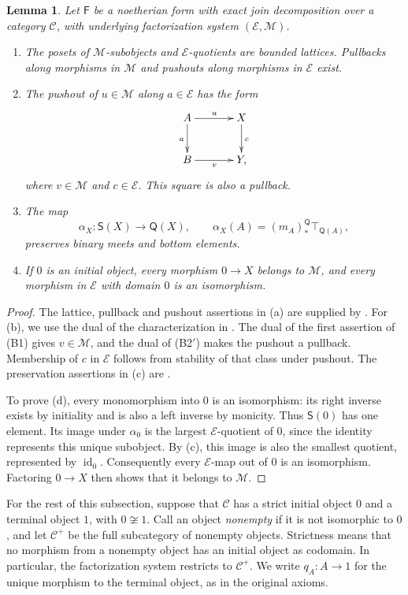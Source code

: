 \documentclass[11pt,a4paper]{article}
\theoremstyle{plain}
\newtheorem{lemma}[theorem]{Lemma}
\theoremstyle{definition}
\theoremstyle{remark}
\newcommand{\id}{\operatorname{id}}
\begin{document}
\begin{lemma}\label{lem:ejd-background}
Let $\mathsf F$ be a noetherian form with exact join decomposition
over a category $\mathcal C$, with underlying factorization system
$(\mathcal E,\mathcal M)$.
\begin{enumerate}
\item The posets of $\mathcal M$-subobjects and
$\mathcal E$-quotients are bounded lattices. Pullbacks along
morphisms in $\mathcal M$ and pushouts along morphisms in
$\mathcal E$ exist.
\item The pushout of $u\in\mathcal M$ along $a\in\mathcal E$
has the form
\[
\xymatrix@C=3.5em@R=2.4em{
A\ar[r]^u\ar[d]_a&X\ar[d]^c\\
B\ar[r]_v&Y,
}
\]
where $v\in\mathcal M$ and $c\in\mathcal E$. This square is
also a pullback.
\item The map
\[
\alpha_X:\mathsf S(X)\longrightarrow\mathsf Q(X),\qquad
\alpha_X(A)=(m_A)_*^{\mathsf Q}\top_{\mathsf Q(A)},
\]
preserves binary meets and bottom elements.
\item If $0$ is an initial object, every morphism $0\to X$
belongs to $\mathcal M$, and every morphism in $\mathcal E$
with domain $0$ is an isomorphism.
\end{enumerate}
\end{lemma}
\begin{proof}
The lattice, pullback and pushout assertions in (a) are supplied
by \cite[Theorem 100]{JanelidzeVanNiekerk}. For (b), we use
the dual of the characterization in
\cite[Theorem 167]{JanelidzeVanNiekerk}. The dual of the first
assertion of (B1) gives $v\in\mathcal M$, and the dual of
(B2$'$) makes the pushout a pullback. Membership of $c$ in
$\mathcal E$ follows from stability of that class under pushout.
The preservation assertions in (c) are
\cite[Theorem 163(ii)]{JanelidzeVanNiekerk}.

To prove (d), every monomorphism into $0$ is an isomorphism:
its right inverse exists by initiality and is also a left inverse
by monicity. Thus $\mathsf S(0)$ has one element. Its image under
$\alpha_0$ is the largest $\mathcal E$-quotient of $0$, since
the identity represents this unique subobject. By (c), this image
is also the smallest quotient, represented by $\id_0$.
Consequently every $\mathcal E$-map out of $0$ is an isomorphism.
Factoring $0\to X$ then shows that it belongs to $\mathcal M$.
\end{proof}

\label{not:nonempty-subcategory}
For the rest of this subsection, suppose that $\mathcal C$ has a
strict initial object $0$ and a terminal object $1$, with
$0\not\cong1$. Call an object \emph{nonempty} if it is not
isomorphic to $0$, and let $\mathcal C^+$ be the full subcategory
of nonempty objects. Strictness means that no morphism from a
nonempty object has an initial object as codomain. In particular,
the factorization system restricts to $\mathcal C^+$.
We write $q_A:A\to1$ for the unique morphism to the terminal
object, as in the original axioms.
\end{document}
